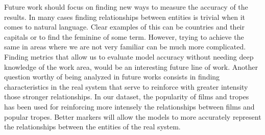 \documentclass[letterpaper]{article}
\begin{document}
	Future work should focus on finding new ways to measure the accuracy of the results. In many cases finding relationships between entities is trivial when it comes to natural language. Clear examples of this can be countries and their capitals or to find the feminine of some term. However, trying to achieve the same in areas where we are not very familiar can be much more complicated. Finding metrics that allow us to evaluate model accuracy without needing deep knowledge of the work area, would be an interesting future line of work. Another question worthy of being analyzed in future works consists in finding characteristics in the real system that serve to reinforce with greater intensity those stronger relationships. In our dataset, the popularity of films and tropes has been used for reinforcing more intensely the relationships between films and popular tropes. Better markers will allow the models to more accurately represent the relationships between the entities of the real system.
	
	
	
	
	
	
\end{document}
